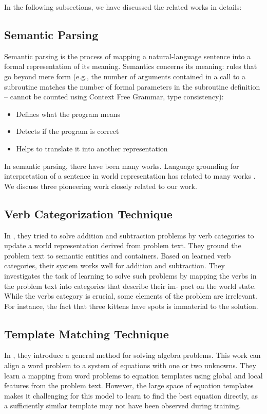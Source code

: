 \documentclass[document.tex]{subfiles}
\begin{document}
In the following subsections, we have discussed the related works in details:
\subsection{Semantic Parsing}
\noindent Semantic parsing is the process of mapping a natural-language sentence into a formal representation of its meaning. Semantics concerns its meaning: rules that go beyond mere
form (e.g., the number of arguments contained in a call to a
subroutine matches the number of formal parameters in the
subroutine definition – cannot be counted using Context Free Grammar, type
consistency):
\begin{itemize}
	\item Defines what the program means
	\item Detects if the program is correct
	\item Helps to translate it into another representation
\end{itemize}
In semantic parsing, there have been many works. Language grounding for interpretation of a sentence in world representation has related to many works \cite{13, 14, 15, 16, 17, 18, 19, 20, 21, 22, 23}. We discuss three pioneering work closely related to our work.
\subsection{Verb Categorization Technique}
\noindent In \cite{1}, they tried to solve addition and subtraction problems by verb categories to update a world representation derived from problem text. They ground the problem text to semantic entities and containers. Based on learned verb categories, their system works well for addition and subtraction.
They investigates the task of learning to
solve such problems by mapping the verbs in the
problem text into categories that describe their im-
pact on the world state. While the verbs category
is crucial, some elements of the
problem are irrelevant. For instance, the fact that
three kittens have spots is immaterial to the solution. 
\subsection{Template Matching Technique}
\noindent In \cite{2}, they introduce a general method for solving algebra problems. This work can align a word problem to a system of equations with one or two unknowns. They learn a mapping from word problems to equation templates using global and local features from the problem text. However, the
large space of equation templates makes it challenging for this model to learn to find the best equation
directly, as a sufficiently similar template may not
have been observed during training.
\end{document}
